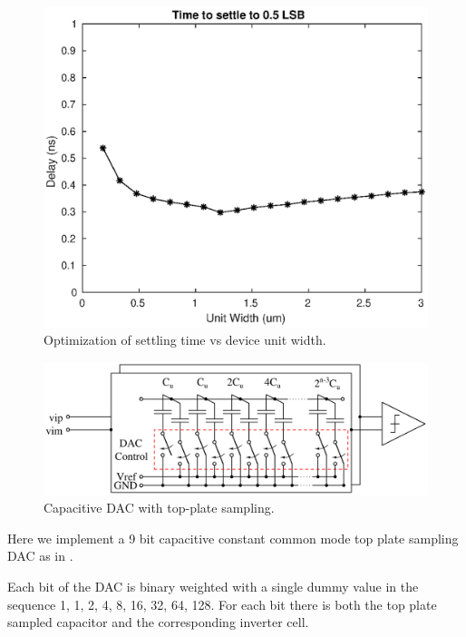 \documentclass[10pt,journal]{IEEEtran}\usepackage{longtable}
\begin{document}
\begin{figure}[tbph]
\begin{center}
\includegraphics[width=1\columnwidth]{dac_optimization.eps}
\caption{Optimization of settling time vs device unit width.}
\label{fig:DacOptimization}
\end{center}
\end{figure}
\begin{figure}[tbph]
\begin{center}
\includegraphics[width=1\columnwidth]{CapDacV3.pdf}
\caption{Capacitive DAC with top-plate sampling.}
\label{fig:CapDac}
\end{center}
\end{figure}

Here we implement a 9 bit capacitive constant common mode top plate sampling DAC as in \cite{Tripathi:2013}.

Each bit of the DAC is binary weighted with a single dummy value in the
sequence 1, 1, 2, 4, 8, 16, 32, 64, 128.
For each bit there is both the top plate sampled capacitor and the corresponding inverter cell.
\end{document}
